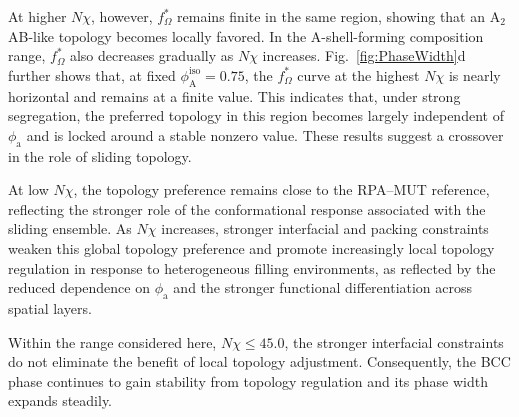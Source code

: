 At higher $N\chi$, however, $f_\Omega^\ast$ remains finite in the same region, showing that an A$_2$AB-like topology becomes locally favored.
In the A-shell-forming composition range, $f_\Omega^\ast$ also decreases gradually as $N\chi$ increases.
Fig.~\ref{fig:PhaseWidth}d further shows that, at fixed $\phi_{\mathrm A}^{\mathrm{iso}}=0.75$, the $f_\Omega^\ast$ curve at the highest $N\chi$ is nearly horizontal and remains at a finite value.
This indicates that, under strong segregation, the preferred topology in this region becomes largely independent of $\phi_{\mathrm a}$ and is locked around a stable nonzero value.
These results suggest a crossover in the role of sliding topology.

At low $N\chi$, the topology preference remains close to the RPA--MUT reference, reflecting the stronger role of the conformational response associated with the sliding ensemble.
As $N\chi$ increases, stronger interfacial and packing constraints weaken this global topology preference and promote increasingly local topology regulation in response to heterogeneous filling environments, as reflected by the reduced dependence on $\phi_{\mathrm a}$ and the stronger functional differentiation across spatial layers.

Within the range considered here, $N\chi\le45.0$, the stronger interfacial constraints do not eliminate the benefit of local topology adjustment.
Consequently, the BCC phase continues to gain stability from topology regulation and its phase width expands steadily.


